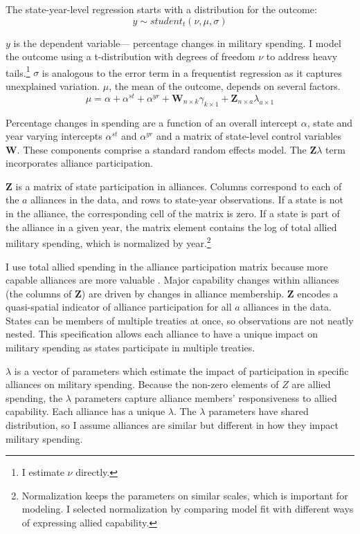 \documentclass[12pt]{article}
\begin{document}
The state-year-level regression starts with a distribution for the outcome:
\begin{equation}
y \sim student_t(\nu, \mu, \sigma)
\end{equation}
 

$y$ is the dependent variable--- percentage changes in military spending. 
I model the outcome using a t-distribution with degrees of freedom $\nu$ to address heavy tails.\footnote{I estimate $\nu$ directly.}
$\sigma$ is analogous to the error term in a frequentist regression as it captures unexplained variation.  
$\mu$, the mean of the outcome, depends on several factors.
\begin{equation}
\mu = \alpha + \alpha^{st} + \alpha^{yr} +\textbf{W}_{n \times k} \gamma_{k \times 1}  + \textbf{Z}_{n \times a} \lambda_{a \times 1} 
\end{equation}


Percentage changes in spending are a function of an overall intercept $\alpha$, state and year varying intercepts $\alpha^{st}$ and $\alpha^{yr}$ and a matrix of state-level control variables $\textbf{W}$.
These components comprise a standard random effects model. 
The $\textbf{Z} \lambda$ term incorporates alliance participation.


$\textbf{Z}$ is a matrix of state participation in alliances. 
Columns correspond to each of the $a$ alliances in the data, and rows to state-year observations. 
If a state is not in the alliance, the corresponding cell of the matrix is zero.
If a state is part of the alliance in a given year, the matrix element contains the log of total allied military spending, which is normalized by year.\footnote{Normalization keeps the parameters on similar scales, which is important for modeling. I selected normalization by comparing model fit with different ways of expressing allied capability.} 


I use total allied spending in the alliance participation matrix because more capable alliances are more valuable \citep{Johnsonetal2015}.
Major capability changes within alliances (the columns of \textbf{Z}) are driven by changes in alliance membership. 
$\textbf{Z}$ encodes a quasi-spatial indicator of alliance participation for all $a$ alliances in the data. 
States can be members of multiple treaties at once, so observations are not neatly nested. 
This specification allows each alliance to have a unique impact on military spending as states participate in multiple treaties. 


$\lambda$ is a vector of parameters which estimate the impact of participation in specific alliances on military spending. 
Because the non-zero elements of $Z$ are allied spending, the $\lambda$ parameters capture alliance members' responsiveness to allied capability. 
Each alliance has a unique $\lambda$. 
The $\lambda$ parameters have shared distribution, so I assume alliances are similar but different in how they impact military spending. 
\end{document}
